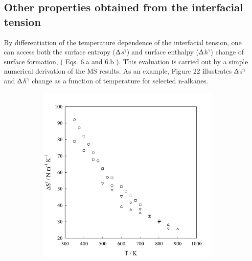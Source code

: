 \documentclass[9pt,bestpractices]{livecoms}
\begin{document}
\subsection{Other properties obtained from the interfacial tension}

By differentiation of the temperature dependence of the interfacial tension,
one can access both  the surface entropy (${\Updelta}$\textit{s}$^{{\gamma}}$)
and surface enthalpy (${\Updelta}$\textit{h}$^{{\gamma}}$) change of surface
formation, ( Eqs. 6.a and 6.b ). This evaluation is carried out by a simple
numerical derivation of the MS results. As an example, Figure 22 illustrates
${\Updelta}$\textit{s}$^{\mathrm{{\gamma}}}$ and
${\Updelta}$\textit{h}$^{\mathrm{{\gamma}}}$ change as a function of
temperature for selected n-alkanes.

\begin{figure}
	\centering
	\begin{subfigure}{0.8\linewidth} %
    \includegraphics[width=1\textwidth]{gfx/image68.jpeg}
	\end{subfigure}
	\begin{subfigure}{0.8\linewidth} %

\end{subfigure}
\end{figure}
\end{document}
